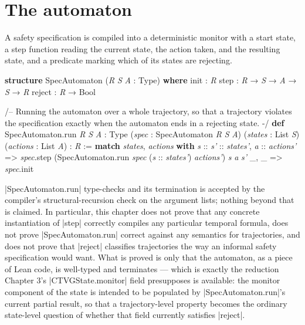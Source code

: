 \documentclass{memoir}
\begin{document}
\section{The automaton}\label{Capability--Monotonicity--in--a--Formal--Skeleton--for--Agentic--AI--Safety----The--Specification--Automaton----The--automaton}

A safety specification is compiled into a deterministic monitor with a
start state, a step function reading the current state, the action taken,
and the resulting state, and a predicate marking which of its states are
rejecting.

\begin{LeanVerbatim}
\textbf{structure} SpecAutomaton (\textit{R} \textit{S} \textit{A} : Type) \textbf{where}
  init    : \textit{R}
  step    : \textit{R} → \textit{S} → \textit{A} → \textit{S} → \textit{R}
  reject  : \textit{R} → Bool

/-- Running the automaton over a whole trajectory, so that a trajectory
violates the specification exactly when the automaton ends in a rejecting
state. -/
\textbf{def} SpecAutomaton.run \textit{R} \textit{S} \textit{A} : Type (\textit{spec} : SpecAutomaton \textit{R} \textit{S} \textit{A})
    (\textit{states} : List \textit{S}) (\textit{actions} : List \textit{A}) : \textit{R} :=
  \textbf{match} \textit{states}, \textit{actions} \textbf{with}
   \textit{s} :: \textit{s'} :: \textit{states'}, \textit{a} :: \textit{actions'} =>
      \textit{spec}.step (SpecAutomaton.run \textit{spec} (\textit{s} :: \textit{states'}) \textit{actions'}) \textit{s} \textit{a} \textit{s'}
   _, _ => \textit{spec}.init

\end{LeanVerbatim}


\LeanVerb|SpecAutomaton.run| type-checks and its termination is accepted by the
compiler's structural-recursion check on the argument lists; nothing beyond
that is claimed. In particular, this chapter does not prove that any
concrete instantiation of \LeanVerb|step| correctly compiles any particular temporal
formula, does not prove \LeanVerb|SpecAutomaton.run| correct against any semantics
for trajectories, and does not prove that \LeanVerb|reject| classifies trajectories
the way an informal safety specification would want. What is proved is only
that the automaton, as a piece of Lean code, is well-typed and terminates —
which is exactly the reduction Chapter 3's \LeanVerb|CTVGState.monitor| field
presupposes is available: the monitor component of the state is intended to
be populated by \LeanVerb|SpecAutomaton.run|'s current partial result, so that a
trajectory-level property becomes the ordinary state-level question of
whether that field currently satisfies \LeanVerb|reject|.
\end{document}
